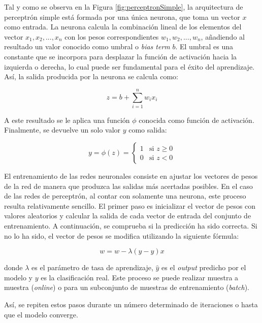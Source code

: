 \documentclass[11pt,spanish,listoffigures,listoftables]{tfgetsinf}
\begin{document}
Tal y como se observa en la Figura \ref{fig:perceptronSimple}, la arquitectura de perceptrón simple está formada por una única neurona, que toma un vector $x$ como entrada. La neurona calcula la combinación lineal de los elementos del vector $x_1, x_2, ..., x_n$ con los pesos correspondientes $w_1, w_2, ..., w_n$, añadiendo al resultado un valor conocido como umbral o \textit{bias term} $b$. El umbral es una constante que se incorpora para desplazar la función de activación hacia la izquierda o derecha, lo cual puede ser fundamental para el éxito del aprendizaje. Así, la salida producida por la neurona se calcula como:

 \begin{equation}
\label{form:calcularZ}
z = b + \sum_{i = 1}^n w_i x_i
\end{equation}

 A este resultado se le aplica una función $\phi$ conocida como función de activación. Finalmente, se devuelve un solo valor $y$ como salida:

\begin{equation}
y = \phi(z) = 
\begin{cases}
	1 & \text{si } z \ge 0 \\
	0 & \text{si } z < 0
\end{cases}
\end{equation}

El entrenamiento de las redes neuronales consiste en ajustar los vectores de pesos de la red de manera que produzca las salidas más acertadas posibles. En el caso de las redes de perceptrón, al contar con solamente una neurona, este proceso resulta relativamente sencillo. El primer paso es inicializar el vector de pesos con valores aleatorios y calcular la salida de cada vector de entrada del conjunto de entrenamiento. A continuación, se comprueba si la predicción ha sido correcta. Si no lo ha sido, el vector de pesos se modifica utilizando la siguiente fórmula:

\begin{equation}
w = w - \lambda(\hat{y}-y)x
\end{equation}

donde $\lambda$ es el parámetro de tasa de aprendizaje, $\hat{y}$ es el \textit{output} predicho por el modelo y $y$ es la clasificación real. Este proceso se puede realizar muestra a muestra (\textit{online}) o para un subconjunto de muestras de entrenamiento (\textit{batch}).

Así, se repiten estos pasos durante un número determinado de iteraciones o hasta que el modelo converge.
\end{document}
